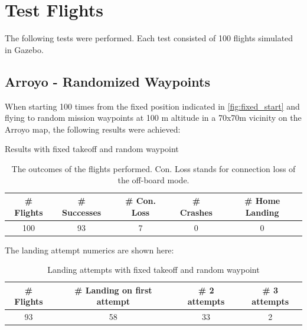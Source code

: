 \section{Test Flights}\label{sec:test_flights}

The following tests were performed. Each test consisted of 100 flights simulated in Gazebo.

\subsection{Arroyo - Randomized Waypoints}\label{subsec:eval_rand_wp}

When starting 100 times from the fixed position indicated in \cref{fig:fixed_start} and flying to random mission waypoints at 100 m altitude in a 70x70m vicinity on the Arroyo map, the following results were achieved:

\begin{table}[h]
    \begin{center}
     \caption{Results with fixed takeoff and random waypoint}\vspace{1ex}
     \label{tab:result_random_waypoint}
     \begin{tabular}{|c|c|c|c|c|}
     \hline
     \# Flights & \# Successes & \# Con. Loss & \# Crashes & \# Home Landing\\ \hline \hline
     100 & 93 & 7 & 0 & 0 \\
     \hline
     \end{tabular}
     \caption{The outcomes of the flights performed. Con. Loss stands for connection loss of the off-board mode.}
    \end{center}
    \end{table}

    The landing attempt numerics are shown here:

    \begin{table}[h]
        \begin{center}
         \caption{Landing attempts with fixed takeoff and random waypoint}\vspace{1ex}
         \label{tab:land_nums_random_waypoint}
         \begin{tabular}{|c|c|c|c|}
         \hline
         \# Flights & \# Landing on first attempt & \# 2 attempts & \# 3 attempts\\ \hline \hline
         93 & 58 & 33 & 2 \\
         \hline
         \end{tabular}
        \end{center}
    \end{table}

